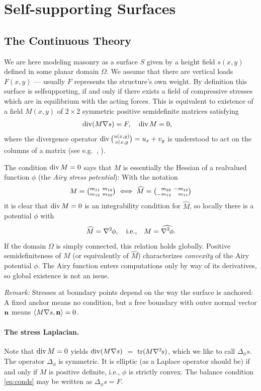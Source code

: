 \documentclass[annual]{acmsiggraph}
\def\<{\mathchoice{\big\langle}{\langle}{\langle}{\langle}}
\def\>{\mathchoice{\big\rangle}{\rangle}{\rangle}{\rangle}}
\def\wh{\widehat}
\def\Div{\mathop{{\rm div}}\nolimits}
\def\tr{\mathop{{\rm tr}}\nolimits}
\def\ess{s}
\def\Hess#1{{\def\testess{#1}\nabla^2\ifx\testess\ess\!s\else #1\fi}}
\def\Hess#1{\text{$\nabla^2\hskip-.2ex #1$}}
\begin{document}

\section{Self-supporting Surfaces}

\subsection{The Continuous Theory}

We are here modeling masonry as a surface $S$ given by a height field
$s(x,y)$ defined in some planar domain $\Omega$. We assume that there are
vertical loads $F(x,y)$ --- usually $F$ represents the structure's own
weight. By definition this surface is self\dash supporting, if and only if
there exists a field of compressive stresses which are in equilibrium with
the acting forces. This is equivalent to existence of a field $M(x,y)$ of
$2\times 2$ symmetric positive semidefinite matrices satisfying
	\begin{align}
	\Div (M\nabla s) = F, \quad
	\Div M &= 0,
	  \label{eq:conds}
	\end{align}
 where the divergence operator $\Div{u(x,y)\choose v(x,y}= u_x + v_y$ is
understood to act on the columns of a matrix (see e.g.\
\cite{Fraternali2010}, \cite{Giaquinta1985}). 

The condition $\Div M=0$ says that $M$ is essentially the Hessian of a
real\dash valued function $\phi$ (the {\em Airy stress potential}): With
the notation
	$$
	M =
	{\textstyle {m_{11} \ m_{12} \choose m_{12} \ m_{22}}}
	\iff	
	\wh M =
	{\textstyle {\hphantom{-}m_{22} \ -m_{12} \choose -m_{12}
		 \ \hphantom{-}m_{11}}}
	$$
 it is clear that $\Div M=0$ is an integrability condition for $\wh M$, so
locally there is a potential $\phi$ with
	$$
	\wh M = \Hess\phi, \quad \text{i.e.,}\quad
	M = \wh{\Hess\phi}.
	$$
 If the domain $\Omega$ is simply connected, this relation holds globally.
Positive semidefiniteness of $M$ (or equivalently of $\wh M$) 
characterizes {\em convexity} of the Airy potential $\phi$.
The Airy function enters computations only by way of its derivatives,
so global existence is not an issue.

{\it Remark:} Stresses at boundary points depend on the way the surface is
anchored: A fixed anchor means no condition, but a free boundary with
outer normal vector ${\mathbf n}$ means $\<M \nabla s, \nw \> = 0$.


\paragraph{The stress Laplacian.}
Note that $\Div M =0$ yields $\Div(M\nabla s)$ $ =$ $ \tr(M\Hess
s)$, which we like to call $\Delta_\phi s$. The operator $\Delta_\phi$ is
symmetric. It is elliptic (as a Laplace operator should be) if and
only if $M$ is positive definite, i.e., $\phi$ is strictly convex. The
balance condition \eqref{eq:conds} may be written as
	$
	\Delta_\phi s = F.
	$
\end{document}
